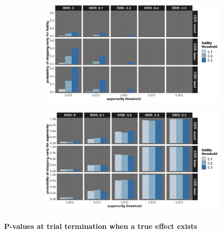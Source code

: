 \documentclass[]{article}
\let\oldparagraph\paragraph
\renewcommand{\paragraph}[1]{\oldparagraph{#1}\mbox{}}
\begin{document}
\begin{figure}
\centering
  \caption{Probability of stopping early due to futility, and stopping early due to superiority. Stopping probabilities
  are presented for the three control event rates (CER – rows), four relative risk reductions (RRR – columns), and three futility thresholds (legend).}
  \label{fig:fig}
  \begin{subfigure}{0.8\textwidth}
    \centering
    \caption{}
    \includegraphics{../p1_plots/batch_size_nb_3000/prob_stop_early_fut_p1.png}
  \end{subfigure}
  \begin{subfigure}{0.8\textwidth}
    \centering
    \caption{}
    \includegraphics{../p1_plots/batch_size_nb_3000/prob_stop_early_sup_p1.png}
  \end{subfigure}
\end{figure}

\hypertarget{p-values-at-trial-termination-when-a-true-effect-exists-2}{%
\paragraph{P-values at trial termination when a true effect
exists}\label{p-values-at-trial-termination-when-a-true-effect-exists-2}}
\end{document}
